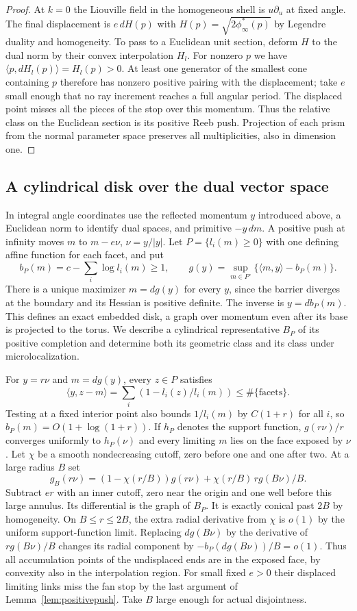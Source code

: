 \begin{proof}
At $k=0$ the Liouville field in the homogeneous shell is $u\partial_u$ at fixed angle. The final displacement is $e\,dH(p)$ with $H(p)=\sqrt{2\phi_\infty^*(p)}$ by Legendre duality and homogeneity. To pass to a Euclidean unit section, deform $H$ to the dual norm by their convex interpolation $H_l$. For nonzero $p$ we have $\langle p,dH_l(p)\rangle=H_l(p)>0$. At least one generator of the smallest cone containing $p$ therefore has nonzero positive pairing with the displacement; take $e$ small enough that no ray increment reaches a full angular period. The displaced point misses all the pieces of the stop over this momentum. Thus the relative class on the Euclidean section is its positive Reeb push. Projection of each prism from the normal parameter space preserves all multiplicities, also in dimension one.
\end{proof}

\subsection{A cylindrical disk over the dual vector space}
In integral angle coordinates use the reflected momentum $y$ introduced above, a Euclidean norm to identify dual spaces, and primitive $-y\,dm$. A positive push at infinity moves $m$ to $m-e\nu$, $\nu=y/|y|$. Let $P=\{l_i(m)\ge0\}$ with one defining affine function for each facet, and put
\[
      b_P(m)=c-\sum_i\log l_i(m)\ge1,\qquad
      g(y)=\sup_{m\in P^\circ}\{\langle m,y\rangle-b_P(m)\}.
\]
There is a unique maximizer $m=dg(y)$ for every $y$, since the barrier diverges at the boundary and its Hessian is positive definite. The inverse is $y=db_P(m)$. This defines an exact embedded disk, a graph over momentum even after its base is projected to the torus. We describe a cylindrical representative $B_P$ of its positive completion and determine both its geometric class and its class under microlocalization.

For $y=r\nu$ and $m=dg(y)$, every $z\in P$ satisfies
\[
             \langle y,z-m\rangle=\sum_i(1-l_i(z)/l_i(m))
                              \le \#\{\text{facets}\}.
\]
Testing at a fixed interior point also bounds $1/l_i(m)$ by $C(1+r)$ for all $i$, so $b_P(m)=O(1+\log(1+r))$. If $h_P$ denotes the support function, $g(r\nu)/r$ converges uniformly to $h_P(\nu)$ and every limiting $m$ lies on the face exposed by $\nu$. Let $\chi$ be a smooth nondecreasing cutoff, zero before one and one after two. At a large radius $B$ set
\[
        g_B(r\nu)=(1-\chi(r/B))g(r\nu)
                         +\chi(r/B)\,r g(B\nu)/B .
\]
Subtract $e r$ with an inner cutoff, zero near the origin and one well before this large annulus. Its differential is the graph of $B_P$. It is exactly conical past $2B$ by homogeneity. On $B\le r\le2B$, the extra radial derivative from $\chi$ is $o(1)$ by the uniform support-function limit. Replacing $dg(B\nu)$ by the derivative of $r g(B\nu)/B$ changes its radial component by $-b_P(dg(B\nu))/B=o(1)$. Thus all accumulation points of the undisplaced ends are in the exposed face, by convexity also in the interpolation region. For small fixed $e>0$ their displaced limiting links miss the fan stop by the last argument of Lemma~\ref{lem:positivepush}. Take $B$ large enough for actual disjointness.

